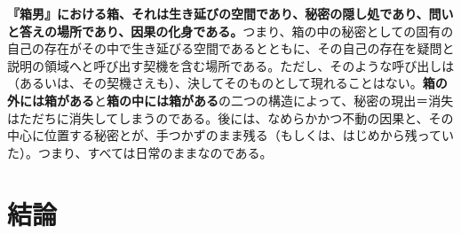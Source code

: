 \documentclass[9pt,b5j,twoside,twocolumn]{utarticle}
\begin{document}
\textbf{『箱男』における箱、それは生き延びの空間であり、秘密の隠し処であり、問いと答えの場所であり、因果の化身である。}つまり、箱の中の秘密としての固有の自己の存在がその中で生き延びる空間であるとともに、その自己の存在を疑問と説明の領域へと呼び出す契機を含む場所である。ただし、そのような呼び出しは（あるいは、その契機さえも）、決してそのものとして現れることはない。\textbf{箱の外には箱がある}と\textbf{箱の中には箱がある}の二つの構造によって、秘密の現出＝消失はただちに消失してしまうのである。後には、なめらかかつ不動の因果と、その中心に位置する秘密とが、手つかずのまま残る（もしくは、はじめから残っていた）。つまり、すべては日常のままなのである。

\section{結論}
\end{document}

